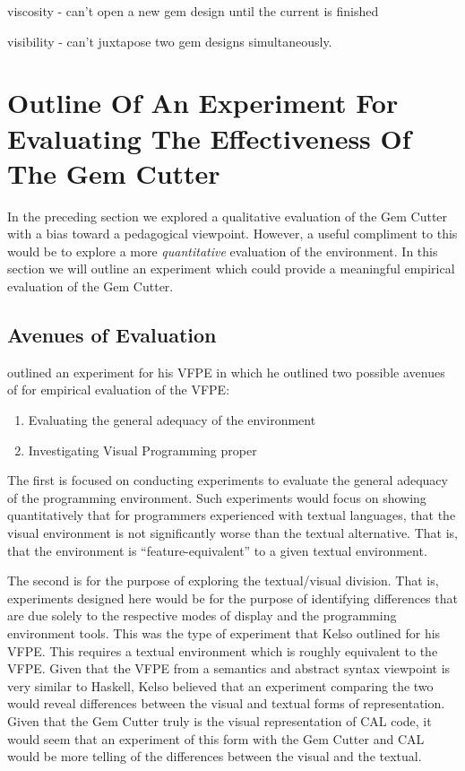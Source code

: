 viscosity - can't open a new gem design until the current is finished

visibility - can't juxtapose two gem designs simultaneously.

\section{Outline Of An Experiment For Evaluating The Effectiveness Of The Gem Cutter}

In the preceding section we explored a qualitative evaluation of the Gem Cutter with a bias toward a pedagogical viewpoint.  However, a useful compliment to this would be to explore a more \emph{quantitative} evaluation of the environment.  In this section we will outline an experiment which could provide a meaningful empirical evaluation of the Gem Cutter.

\subsection{Avenues of Evaluation}

\cite{Kelso02} outlined an experiment for his VFPE in which he outlined two possible avenues of for empirical evaluation of the VFPE:

\begin{enumerate}
	\item Evaluating the general adequacy of the environment
	\item Investigating Visual Programming proper
\end{enumerate}

The first is focused on conducting experiments to evaluate the general adequacy of the programming environment.  Such experiments would focus on showing quantitatively that for programmers experienced with textual languages, that the visual environment is not significantly worse than the textual alternative.  That is, that the environment is ``feature-equivalent'' to a given textual environment.

The second is for the purpose of exploring the textual/visual division.  That is, experiments designed here would be for the purpose of identifying differences that are due solely to the respective modes of display and the programming environment tools.  This was the type of experiment that Kelso outlined for his VFPE.  This requires a textual environment which is roughly equivalent to the VFPE.  
Given that the VFPE from a semantics and abstract syntax viewpoint is very similar to Haskell, Kelso believed that an experiment comparing the two would reveal differences between the visual and textual forms of representation.  Given that the Gem Cutter truly is the visual representation of CAL code, it would seem that an experiment of this form with the Gem Cutter and CAL would be more telling of the differences between the visual and the textual.


